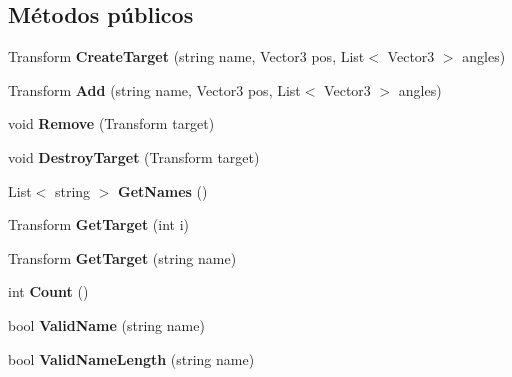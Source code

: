 \subsection*{Métodos públicos}
\begin{DoxyCompactItemize}
\item 
\mbox{\label{class_target_control_a87c7dc05ecebaef86c6d6be9d8daaa0c}} 
Transform {\bfseries Create\+Target} (string name, Vector3 pos, List$<$ Vector3 $>$ angles)
\item 
\mbox{\label{class_target_control_a5e5fc43fd995ec2863ad896a301fd3c2}} 
Transform {\bfseries Add} (string name, Vector3 pos, List$<$ Vector3 $>$ angles)
\item 
\mbox{\label{class_target_control_a118416e825413adb6c4c60ac7b08ff69}} 
void {\bfseries Remove} (Transform target)
\item 
\mbox{\label{class_target_control_a728aecb12c800b1989977044e22264bb}} 
void {\bfseries Destroy\+Target} (Transform target)
\item 
\mbox{\label{class_target_control_a0a09ff530caea4a96bbcfe88bd63f238}} 
List$<$ string $>$ {\bfseries Get\+Names} ()
\item 
\mbox{\label{class_target_control_a86dcdb984de7099a9db940312a2aa541}} 
Transform {\bfseries Get\+Target} (int i)
\item 
\mbox{\label{class_target_control_ac0274d2169116589048ea53988cdbc34}} 
Transform {\bfseries Get\+Target} (string name)
\item 
\mbox{\label{class_target_control_a7a5424ff72566de173d0cd19295b2532}} 
int {\bfseries Count} ()
\item 
\mbox{\label{class_target_control_a6fc8e97f10a1270357d483e629c0a899}} 
bool {\bfseries Valid\+Name} (string name)
\item 
\mbox{\label{class_target_control_a87d8a6a4fdf71334afd9e5d5c6204f90}} 
bool {\bfseries Valid\+Name\+Length} (string name)
\end{DoxyCompactItemize}
